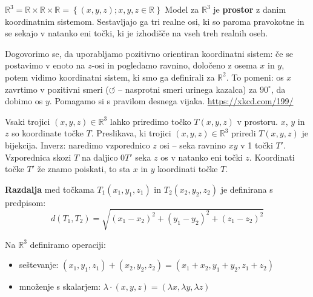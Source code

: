 \documentclass[a4,12pt]{article}
\newcommand{\degree}{^\circ}
\newcommand{\R}{\mathbb{R}}
\begin{document}
    \noindent \(\R^3 = \R \times \R \times \R = \left\{\left(x, y, z\right); x,y,z \in \R\right\}\)
    Model za \(\R^3\) je \textbf{prostor} z danim koordinatnim sistemom. Sestavljajo ga tri realne osi, ki
    so paroma pravokotne in se sekajo v natanko eni točki, ki je izhodišče na vseh treh realnih oseh.

    Dogovorimo se, da uporabljamo pozitivno orientiran koordinatni sistem: če se postavimo v enoto na \(z\)-osi in
    pogledamo ravnino, določeno z osema \(x\) in \(y\), potem vidimo koordinatni sistem, ki smo ga definirali za \(\R^2\). To pomeni:
    os \(x\) zavrtimo v pozitivni smeri (\(\circlearrowleft\) -- nasprotni smeri urinega kazalca) za \(90 \degree\), da dobimo os \(y\).
    Pomagamo si s pravilom desnega vijaka. \url{https://xkcd.com/199/}

    Vsaki trojici \(\left(x, y, z\right) \in \R^3\) lahko priredimo točko \(T\left(x, y, z\right)\) v prostoru.
    \(x\), \(y\) in \(z\) so koordinate točke \(T\).
    Preslikava, ki trojici \((x, y, z) \in \R^3\) priredi \(T\left(x, y, z\right)\) je bijekcija.
    Inverz: naredimo vzporednico \(z\) osi -- seka ravnino \(xy\) v 1 točki \(T'\). Vzporednica skozi 
    \(T\) na daljico \(0T'\) seka \(z\) os v natanko eni točki \(z\). Koordinati točke \(T'\) že 
    znamo poiskati, to sta \(x\) in \(y\) koordinati točke \(T\).

    \textbf{Razdalja} med točkama \(T_1\left(x_1, y_1, z_1\right)\) in \(T_2\left(x_2, y_2, z_2\right)\) je definirana s predpisom:
    \[d\left(T_1, T_2\right) = \sqrt{{\left(x_1 - x_2\right)}^2 + {\left(y_1 - y_2\right)}^2 + {\left(z_1 - z_2\right)}^2}\]

    Na \(\R^3\) definiramo operaciji: \begin{itemize}
        \item seštevanje: \(\left(x_1, y_1, z_1\right) + \left(x_2, y_2, z_2\right) = \left(x_1 + x_2, y_1 + y_2, z_1 + z_2\right)\)
        \item množenje s skalarjem: \(\lambda \cdot \left(x, y, z\right) = \left(\lambda x, \lambda y, \lambda z\right)\)
    \end{itemize}
\end{document}
